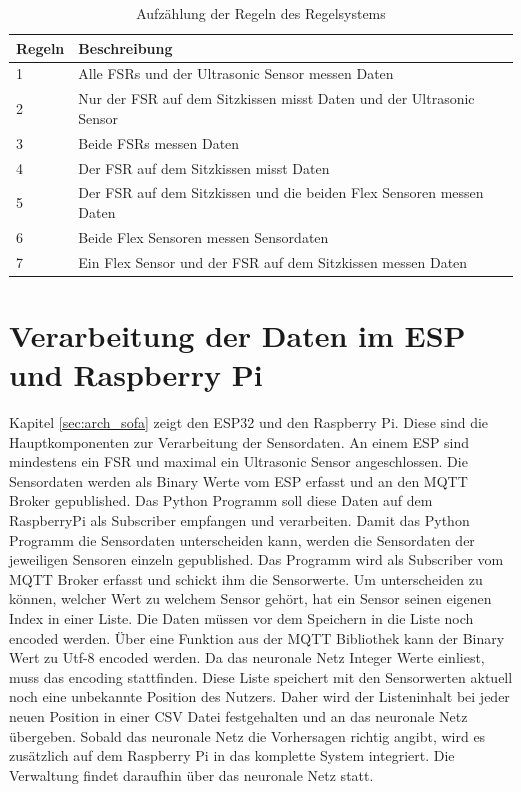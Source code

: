\begin{table}[ht]
	\centering
	\caption[Aufzählung der Regeln des Regelsystems]{Aufzählung der Regeln des Regelsystems}
		\vspace{1.0em}	
	\begin{tabular}{|l|p{7cm}|}
		\hline
		\rowcolor[gray]{0.9}\textbf{Regeln} & \textbf{Beschreibung} \\
		\hline
		\hline
		1 & Alle FSRs und der Ultrasonic Sensor messen Daten \\
		\hline
		2 & Nur der FSR auf dem Sitzkissen misst Daten
		    und der Ultrasonic Sensor \\
		\hline
		3 & Beide FSRs messen Daten \\
		\hline
		4 & Der FSR auf dem Sitzkissen misst Daten \\
		\hline
		5 & Der FSR auf dem Sitzkissen und die beiden Flex Sensoren messen Daten \\
		\hline
		6 & Beide Flex Sensoren messen Sensordaten \\
		\hline
		7 & Ein Flex Sensor und der FSR auf dem Sitzkissen messen Daten \\
		\hline
	\end{tabular}
	\label{tab:tablerules}
\end{table}

\section{Verarbeitung der Daten im ESP und Raspberry Pi}
Kapitel \ref{sec:arch_sofa} zeigt den ESP32 und den Raspberry Pi. Diese sind die Hauptkomponenten zur Verarbeitung der Sensordaten. An einem ESP sind mindestens ein FSR und maximal ein Ultrasonic Sensor angeschlossen. Die Sensordaten werden als Binary Werte vom ESP erfasst und an den MQTT Broker gepublished. Das Python Programm soll diese Daten auf dem RaspberryPi als Subscriber empfangen und verarbeiten. Damit das Python Programm die Sensordaten unterscheiden kann, werden die Sensordaten der jeweiligen Sensoren einzeln gepublished. Das Programm wird als Subscriber vom MQTT Broker erfasst und schickt ihm die Sensorwerte. Um unterscheiden zu können, welcher Wert zu welchem Sensor gehört, hat ein Sensor seinen eigenen Index in einer Liste. Die Daten müssen vor dem Speichern in die Liste noch encoded werden. Über eine Funktion aus der MQTT Bibliothek kann der Binary Wert zu Utf-8 encoded werden. Da das neuronale Netz Integer Werte einliest, muss das encoding stattfinden. Diese Liste speichert mit den Sensorwerten aktuell noch eine unbekannte Position des Nutzers. Daher wird der Listeninhalt bei jeder neuen Position in einer CSV Datei festgehalten und an das neuronale Netz übergeben.
\newline
Sobald das neuronale Netz die Vorhersagen richtig angibt, wird es zusätzlich auf dem Raspberry Pi in das komplette System integriert. Die Verwaltung findet daraufhin über das neuronale Netz statt.

